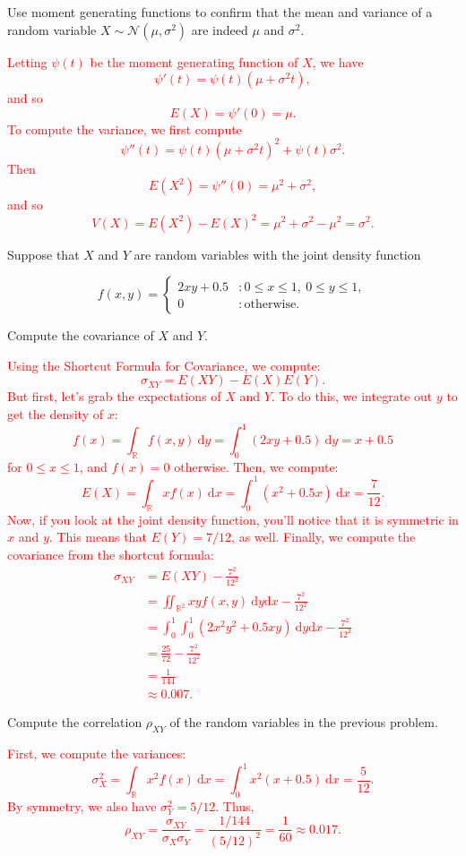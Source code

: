 \documentclass[12pt,reqno]{amsart}
\begin{document}
\prob Use moment generating functions to confirm that the mean and variance of a random variable $X \sim \mathcal{N}(\mu,\sigma^2)$ are indeed $\mu$ and $\sigma^2$.

\bigskip
\textcolor{red}{Letting $\psi(t)$ be the moment generating function of $X$, we have
	\[\psi'(t) = \psi(t) (\mu + \sigma^2 t),
	\]
and so
	\[E(X) = \psi'(0) =  \mu.
	\]
To compute the variance, we first compute
	\[\psi''(t) = \psi(t) (\mu + \sigma^2 t)^2 + \psi(t) \sigma^2.
	\]
Then
	\[E(X^2) = \psi''(0) = \mu^2 + \sigma^2,
	\]
and so
	\[V(X) = E(X^2) - E(X)^2 = \mu^2 + \sigma^2 - \mu^2 = \sigma^2.
	\]}
\bigskip












\prob Suppose that $X$ and $Y$ are random variables with the joint density function

	\[
	f(x,y) = \begin{cases}
	2xy + 0.5 & : 0 \leq x\leq 1, \ 0 \leq y \leq 1, \\
	0 & : \text{otherwise}.
	\end{cases}
	\]
	
Compute the covariance of $X$ and $Y$.

\bigskip
\textcolor{red}{Using the Shortcut Formula for Covariance, we compute:
	\[
	\sigma_{XY} = E(XY) - E(X) E(Y).
	\]
But first, let's grab the expectations of $X$ and $Y$. To do this, we integrate out $y$ to get the density of $x$:
	\[f(x) = \int_{\mathbb{R}} f(x,y) \ \text{d} y = \int_0^1 \left( 2xy+0.5\right) \ \text{d}y = x + 0.5
	\]
for $0\leq x\leq 1$, and $f(x)=0$ otherwise. Then, we compute:
	\[E(X) = \int_{\mathbb{R}} x f(x) \ \text{d}x = \int_0^1 (x^2+0.5x) \ \text{d} x = \frac{7}{12}.
	\]
Now, if you look at the joint density function, you'll notice that it is symmetric in $x$ and $y$. This means that $E(Y) = 7/12$, as well. Finally, we compute the covariance from the shortcut formula:
	\begin{align*}
	\sigma_{XY} &= E(XY) - \frac{7^2}{12^2} \\
	&= \iint_{\mathbb{R}^2} xy f(x,y) \ \text{d}y \text{d}x - \frac{7^2}{12^2} \\
	&= \int_0^1 \int_0^1 (2x^2y^2 + 0.5xy) \ \text{d}y \text{d}x - \frac{7^2}{12^2} \\
	&= \frac{25}{72} - \frac{7^2}{12^2} \\
	&= \frac{1}{144} \\
	&\approx 0.007.
	\end{align*}}
\bigskip








\prob Compute the correlation $\rho_{XY}$ of the random variables in the previous problem.

\bigskip
\textcolor{red}{First, we compute the variances:
	\[\sigma_X^2 = \int_\mathbb{R} x^2 f(x) \ \text{d}x = \int_0^1 x^2(x+0.5) \ \text{d} x =  \frac{5}{12}.
	\]
By symmetry, we also have $\sigma_Y^2 = 5/12$. Thus,
	\[\rho_{XY} = \frac{\sigma_{XY}}{\sigma_X\sigma_Y} = \frac{1/144}{(5/12)^2} = \frac{1}{60} \approx 0.017.
	\]}
\bigskip
\end{document}
